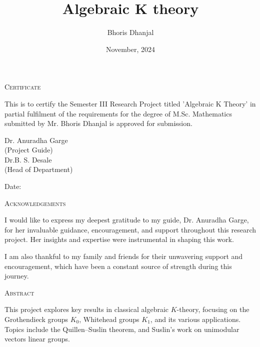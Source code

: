 \documentclass[12pt]{report}
\title{Algebraic K theory}
\author{Bhoris Dhanjal}
\date{November, 2024}
\makeatletter
\numberwithin{equation}{section}
\newcommand\frontmatter{%
	\cleardoublepage
	\pagenumbering{roman}}
\newcommand\mainmatter{%
	\cleardoublepage
	\pagenumbering{arabic}}
\makeatother
\begin{document}
	

	\frontmatter
	
	\begin{center}
		

		{\LARGE {\textsc{Certificate}}}\\[2.5cm]
	\end{center}
	\normalsize This is to certify the Semester III Research Project titled 'Algebraic K Theory' in partial fulfilment of the requirements for the degree of M.Sc. Mathematics  submitted by Mr. Bhoris Dhanjal is approved for submission.
	

	
	\vfill
	
	
	\begin{flushright}
		Dr. Anuradha Garge\\
		(Project Guide)\\[1.5cm]
		Dr.B. S. Desale\\
		(Head of Department)\\
	\end{flushright}
	
	\begin{flushleft}
		Date:
	\end{flushleft}
	\clearpage
	
	\begin{center}
	
	
	{\LARGE {\textsc{Acknowledgements}}}\\[1cm]
\end{center}
I would like to express my deepest gratitude to my guide, Dr. Anuradha Garge, for her invaluable guidance, encouragement, and support throughout this research project. Her insights and expertise were instrumental in shaping this work.

I am also thankful to my family and friends for their unwavering support and encouragement, which have been a constant source of strength during this journey.
	\clearpage
	\begin{center}
		
		
		{\LARGE {\textsc{Abstract}}}\\[1cm]
	\end{center}
This project explores key results in classical algebraic \( K \)-theory, focusing on the Grothendieck groups \( K_0 \), Whitehead groups \( K_1 \), and its various applications. Topics include the Quillen–Suslin theorem, and Suslin's work on unimodular vectors linear groups.
\clearpage
	\tableofcontents
	\mainmatter
	
\end{document}
